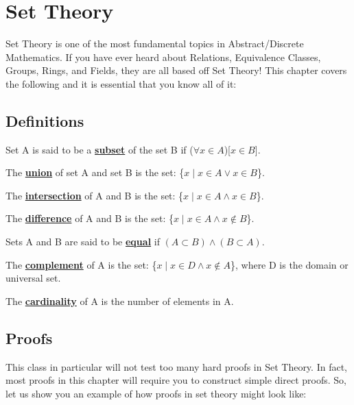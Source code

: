\chapter{Set Theory}
Set Theory is one of the most fundamental topics in Abstract/Discrete
Mathematics. If you have ever heard about Relations, Equivalence Classes,
Groups, Rings, and Fields, they are all based off Set Theory! This chapter
covers the following and it is essential that you know all of it:

\section{Definitions}
\begin{definition}
    Set A is said to be a \underline{\textbf{subset}} of the set B if ($\forall
    x \in A$)[$x \in B$].
\end{definition}

\begin{definition}
    The \underline{\textbf{union}} of set A and set B is the set: \{$x \mid x
    \in A \vee x \in B$\}.
\end{definition}

\begin{definition}
    The \underline{\textbf{intersection}} of A and B is the set: \{$x \mid x
    \in A \wedge x \in B$\}.
\end{definition}

\begin{definition}
    The \underline{\textbf{difference}} of A and B is the set: \{$x \mid x \in
    A \wedge x \not\in B$\}.
\end{definition}

\begin{definition}
    Sets A and B are said to be \underline{\textbf{equal}} if $(A \subset B)
    \wedge (B \subset A)$.
\end{definition}

\begin{definition}
    The \underline{\textbf{complement}} of A is the set: \{$x \mid x \in D
    \wedge x \not\in A$\}, where D is the domain or universal set.
\end{definition}

\begin{definition}
    The \underline{\textbf{cardinality}} of A is the number of elements in A.
\end{definition}

\section{Proofs}
This class in particular will not test too many hard proofs in Set Theory. In
fact, most proofs in this chapter will require you to construct simple direct
proofs. So, let us show you an example of how proofs in set theory might look
like:


